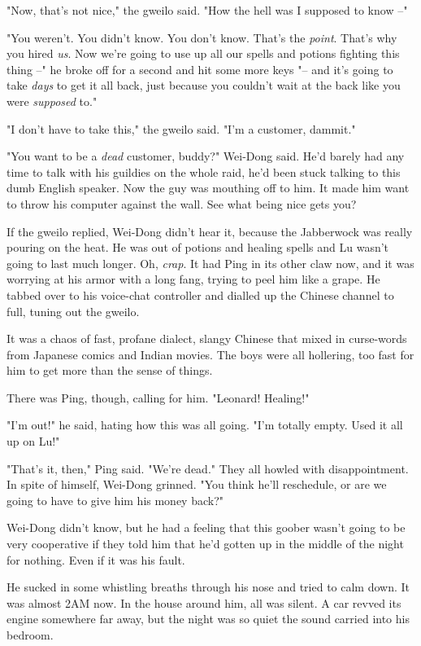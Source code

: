"Now, that's not nice," the gweilo said. "How the hell was I
supposed to know --"

"You weren't. You didn't know. You don't know. That's the
\emph{point}. That's why you hired \emph{us}. Now we're going to
use up all our spells and potions fighting this thing --" he broke
off for a second and hit some more keys "-- and it's going to take
\emph{days} to get it all back, just because you couldn't wait at
the back like you were \emph{supposed} to."

"I don't have to take this," the gweilo said. "I'm a customer,
dammit."

"You want to be a \emph{dead} customer, buddy?" Wei-Dong said. He'd
barely had any time to talk with his guildies on the whole raid,
he'd been stuck talking to this dumb English speaker. Now the guy
was mouthing off to him. It made him want to throw his computer
against the wall. See what being nice gets you?

If the gweilo replied, Wei-Dong didn't hear it, because the
Jabberwock was really pouring on the heat. He was out of potions
and healing spells and Lu wasn't going to last much longer. Oh,
\emph{crap}. It had Ping in its other claw now, and it was worrying
at his armor with a long fang, trying to peel him like a grape. He
tabbed over to his voice-chat controller and dialled up the Chinese
channel to full, tuning out the gweilo.

It was a chaos of fast, profane dialect, slangy Chinese that mixed
in curse-words from Japanese comics and Indian movies. The boys
were all hollering, too fast for him to get more than the sense of
things.

There was Ping, though, calling for him. "Leonard! Healing!"

"I'm out!" he said, hating how this was all going. "I'm totally
empty. Used it all up on Lu!"

"That's it, then," Ping said. "We're dead." They all howled with
disappointment. In spite of himself, Wei-Dong grinned. "You think
he'll reschedule, or are we going to have to give him his money
back?"

Wei-Dong didn't know, but he had a feeling that this goober wasn't
going to be very cooperative if they told him that he'd gotten up
in the middle of the night for nothing. Even if it was his fault.

He sucked in some whistling breaths through his nose and tried to
calm down. It was almost 2AM now. In the house around him, all was
silent. A car revved its engine somewhere far away, but the night
was so quiet the sound carried into his bedroom.

